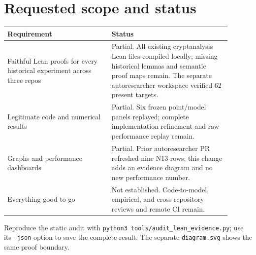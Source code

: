 \documentclass[10pt]{article}
\newcommand{\mono}[1]{\texttt{#1}}
\begin{document}
\section*{Requested scope and status}
\begin{tabular}{|p{0.42\linewidth}|p{0.48\linewidth}|}\hline
Requirement & Status \\ \hline
Faithful Lean proofs for every historical experiment across three repos & Partial. All existing cryptanalysis Lean files compiled locally; missing historical lemmas and semantic proof maps remain. The separate autoresearcher workspace verified 62 present targets. \\ \hline
Legitimate code and numerical results & Partial. Six frozen point/model panels replayed; complete implementation refinement and raw performance replay remain. \\ \hline
Graphs and performance dashboards & Partial. Prior autoresearcher PR refreshed nine N13 rows; this change adds an evidence diagram and no new performance number. \\ \hline
Everything good to go & Not established. Code-to-model, empirical, and cross-repository reviews and remote CI remain. \\ \hline
\end{tabular}

Reproduce the static audit with
\mono{python3 tools/audit\_lean\_evidence.py}; use its \mono{--json} option
to save the complete result.
The separate \mono{diagram.svg} shows the same proof boundary.
\end{document}
